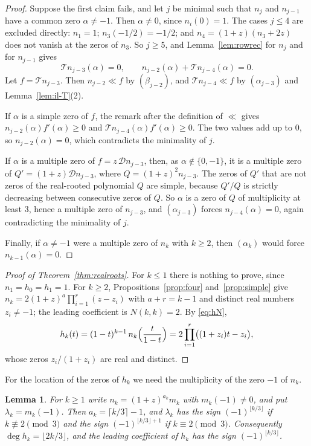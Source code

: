 \documentclass[11pt]{amsart}
\newtheorem{lemma}[theorem]{Lemma}
\theoremstyle{definition}
\begin{document}
\begin{proof}
Suppose the first claim fails, and let $j$ be minimal such that $n_j$ and $n_{j-1}$ have a common zero $\alpha\ne-1$. Then $\alpha\ne0$, since $n_i(0)=1$. The cases $j\le4$ are excluded directly: $n_1=1$; $n_3(-1/2)=-1/2$; and $n_4=(1+z)(n_3+2z)$ does not vanish at the zeros of $n_3$. So $j\ge5$, and Lemma~\ref{lem:rowrec} for $n_j$ and for $n_{j-1}$ gives
\[
  \mathcal Tn_{j-3}(\alpha)=0,\qquad n_{j-2}(\alpha)+\mathcal Tn_{j-4}(\alpha)=0.
\]
Let $f=\mathcal Tn_{j-3}$. Then $n_{j-2}\ll f$ by $(\beta_{j-2})$, and $\mathcal Tn_{j-4}\ll f$ by $(\alpha_{j-3})$ and Lemma~\ref{lem:il-T}(2).

If $\alpha$ is a simple zero of $f$, the remark after the definition of $\ll$ gives $n_{j-2}(\alpha)f'(\alpha)\ge0$ and $\mathcal Tn_{j-4}(\alpha)f'(\alpha)\ge0$. The two values add up to $0$, so $n_{j-2}(\alpha)=0$, which contradicts the minimality of $j$.

If $\alpha$ is a multiple zero of $f=z\,\mathcal Dn_{j-3}$, then, as $\alpha\notin\{0,-1\}$, it is a multiple zero of $Q'=(1+z)\mathcal Dn_{j-3}$, where $Q=(1+z)^2n_{j-3}$. The zeros of $Q'$ that are not zeros of the real-rooted polynomial $Q$ are simple, because $Q'/Q$ is strictly decreasing between consecutive zeros of $Q$. So $\alpha$ is a zero of $Q$ of multiplicity at least $3$, hence a multiple zero of $n_{j-3}$, and $(\alpha_{j-3})$ forces $n_{j-4}(\alpha)=0$, again contradicting the minimality of $j$.

Finally, if $\alpha\ne-1$ were a multiple zero of $n_k$ with $k\ge2$, then $(\alpha_k)$ would force $n_{k-1}(\alpha)=0$.
\end{proof}

\begin{proof}[Proof of Theorem~\ref{thm:realroots}]
For $k\le1$ there is nothing to prove, since $n_1=h_0=h_1=1$. For $k\ge2$, Propositions~\ref{prop:four} and~\ref{prop:simple} give $n_k=2(1+z)^a\prod_{i=1}^{r}(z-z_i)$ with $a+r=k-1$ and distinct real numbers $z_i\ne-1$; the leading coefficient is $N(k,k)=2$. By \eqref{eq:hN},
\[
  h_k(t)=(1-t)^{k-1}\,n_k\Bigl(\frac{t}{1-t}\Bigr)=2\prod_{i=1}^{r}\bigl((1+z_i)t-z_i\bigr),
\]
whose zeros $z_i/(1+z_i)$ are real and distinct.
\end{proof}

For the location of the zeros of $h_k$ we need the multiplicity of the zero $-1$ of $n_k$.

\begin{lemma}\label{lem:minusone}
For $k\ge1$ write $n_k=(1+z)^{a_k}m_k$ with $m_k(-1)\ne0$, and put $\lambda_k=m_k(-1)$. Then $a_k=\lceil k/3\rceil-1$, and $\lambda_k$ has the sign $(-1)^{\lfloor k/3\rfloor}$ if $k\not\equiv2\pmod3$ and the sign $(-1)^{\lfloor k/3\rfloor+1}$ if $k\equiv2\pmod3$. Consequently $\deg h_k=\lfloor2k/3\rfloor$, and the leading coefficient of $h_k$ has the sign $(-1)^{\lfloor k/3\rfloor}$.
\end{lemma}
\end{document}
